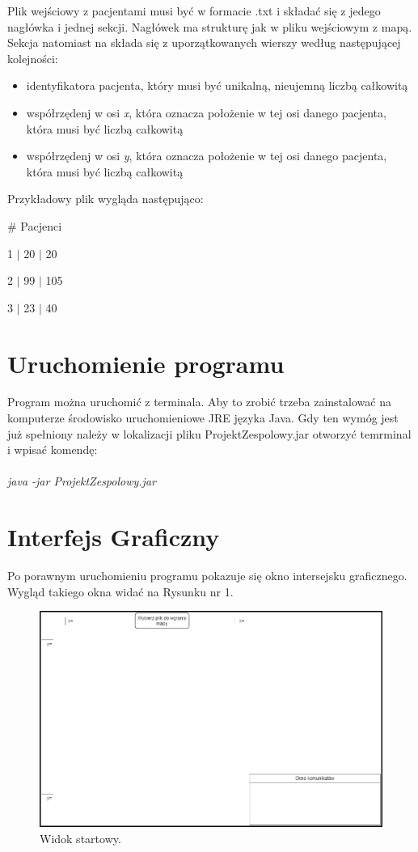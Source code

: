 \documentclass[10pt,a4paper]{article}
\begin{document}
Plik wejściowy z pacjentami musi być w formacie .txt i składać się z jedego nagłówka i jednej sekcji. Nagłówek ma strukturę jak w pliku wejściowym z mapą. Sekcja natomiast na składa się z uporzątkowanych wierszy według następującej kolejności:
\begin{itemize}
\item identyfikatora pacjenta, który musi być unikalną, nieujemną liczbą całkowitą
\item współrzędenj w osi \textit{x}, która oznacza położenie w tej osi danego pacjenta, która musi być liczbą całkowitą
\item współrzędenj w osi \textit{y}, która oznacza położenie w tej osi danego pacjenta, która musi być liczbą całkowitą
\end{itemize}
Przykładowy plik wygląda następująco:
\begin{description}[style=multiline,leftmargin=3cm]
\item \# Pacjenci
\item 1 $\mid$ 20 $\mid$ 20
\item 2 $\mid$ 99 $\mid$ 105
\item 3 $\mid$ 23 $\mid$ 40
\end{description}

\section{Uruchomienie programu}

Program można uruchomić z terminala. Aby to zrobić trzeba zainstalować na komputerze środowisko uruchomieniowe JRE języka Java. Gdy ten wymóg jest już spełniony należy w lokalizacji pliku ProjektZespolowy.jar otworzyć temrminal i wpisać komendę: \\
\\
\textsl{java -jar ProjektZespolowy.jar}

\section{Interfejs Graficzny}

Po porawnym uruchomieniu programu pokazuje się okno intersejsku graficznego. Wygląd takiego okna widać na Rysunku nr 1.

\begin{figure}[h]
  \includegraphics[width=\linewidth]{./images/startowy_widok.png}
  \caption{Widok startowy.}
  \label{fig:GUIstart}
\end{figure}
\end{document}

